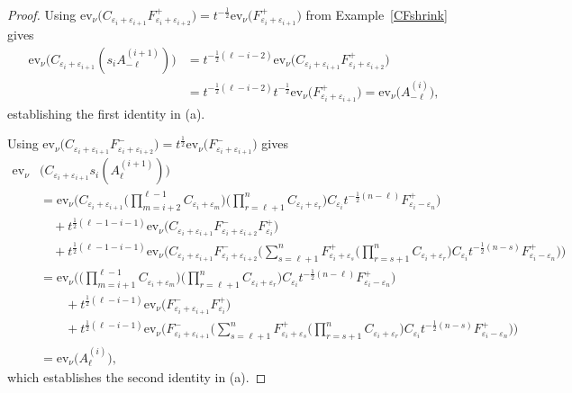 \documentclass[11pt]{article}
\theoremstyle{plain}
\theoremstyle{definition}
\theoremstyle{remark}
\numberwithin{equation}{section}
\def\ev{\mathrm{ev}}
\newcounter{r}
\newcounter{s}
\begin{document}
\begin{proof}
Using
$\ev_\nu\Big(C_{\varepsilon_i+\varepsilon_{i+1}} F^+_{\varepsilon_{i}+\varepsilon_{i+2}} \Big)
 = t^{-\frac12} \ev_\nu\Big(F^+_{\varepsilon_{i}+\varepsilon_{i+1}}\Big)$ from Example~\ref{CFshrink} gives
\begin{align*}
\ev_\nu\Big(C_{\varepsilon_i+\varepsilon_{i+1}}(s_iA^{(i+1)}_{-\ell})\Big) 
&= t^{-\frac12 (\ell-i-2)} \ev_\nu\Big(C_{\varepsilon_i+\varepsilon_{i+1}} F^+_{\varepsilon_{i}+\varepsilon_{i+2}} \Big) \\ 
&
=t^{-\frac12 (\ell-i-2)} t^{-\frac12} \ev_\nu\Big(F^+_{\varepsilon_{i}+\varepsilon_{i+1}} \Big) 
= \ev_\nu\Big(A_{-\ell}^{(i)}\Big),
\end{align*}
establishing the first identity in (a).

Using
$\ev_\nu\Big(C_{\varepsilon_i+\varepsilon_{i+1}} F^-_{\varepsilon_{i}+\varepsilon_{i+2}} \Big)
= t^{\frac12} \ev_\nu\Big(F^-_{\varepsilon_{i}+\varepsilon_{i+1}}\Big)$ gives
\begin{align*}
\ev_\nu&\Big(C_{\varepsilon_i+\varepsilon_{i+1}}s_i \left(A_\ell^{(i+1)} \right) \Big) \\
&= \ev_\nu\Big(C_{\varepsilon_i+\varepsilon_{i+1}} \Big(\prod_{m=i+2}^{\ell-1} C_{\varepsilon_{i}+\varepsilon_m}\Big) 
\Big(\prod_{r=\ell+1}^n C_{\varepsilon_{i} +\varepsilon_r}\Big) C_{\varepsilon_{i}}
t^{-\frac12 (n-\ell)} F^+_{\varepsilon_{i}-\varepsilon_n}\Big) \\
&\quad + t^{\frac12 (\ell-1-i-1)} \ev_\nu\Big(C_{\varepsilon_i+\varepsilon_{i+1}} 
F^-_{\varepsilon_{i}+\varepsilon_{i+2}}
F_{\varepsilon_{i}}^+ \Big) \\
&\quad +t^{\frac12  (\ell-1-i-1)} \ev_\nu\Big(C_{\varepsilon_i+\varepsilon_{i+1}}
F^-_{\varepsilon_{i}+\varepsilon_{i+2}}
\Big(\sum_{s=\ell+1}^n F^+_{\varepsilon_{i}+\varepsilon_s}
\Big(\prod_{r=s+1}^n C_{\varepsilon_{i}+\varepsilon_r}\Big) C_{\varepsilon_i}
t^{-\frac12 (n-s)} F^+_{\varepsilon_{i}-\varepsilon_n}
\Big) \Big)\\
&
=\ev_\nu\Big(\Big(\prod_{m=i+1}^{\ell-1} C_{\varepsilon_{i}+\varepsilon_m}\Big) \Big(\prod_{r=\ell+1}^n C_{\varepsilon_{i} +\varepsilon_r}\Big) C_{\varepsilon_{i}}
t^{-\frac12 (n-\ell)} F^+_{\varepsilon_{i}-\varepsilon_n} \Big)\\
&\qquad + t^{\frac12  (\ell-i-1)}  
\ev_\nu\Big(F^-_{\varepsilon_{i}+\varepsilon_{i+1}}
F_{\varepsilon_{i}}^+  \Big) \\
&\qquad +t^{\frac12  (\ell-i-1)} 
\ev_\nu\Big(F^-_{\varepsilon_{i}+\varepsilon_{i+1}}
\Big(\sum_{s=\ell+1}^n F^+_{\varepsilon_{i}+\varepsilon_s}
\Big(\prod_{r=s+1}^n C_{\varepsilon_{i}+\varepsilon_r}\Big) C_{\varepsilon_i}
t^{-\frac12 (n-s)} F^+_{\varepsilon_{i}-\varepsilon_n}
\Big) \Big) \\
&= \ev_\nu\Big(A_\ell^{(i)} \Big),
\end{align*}
which establishes the second identity in (a).


\end{proof}
\end{document}
